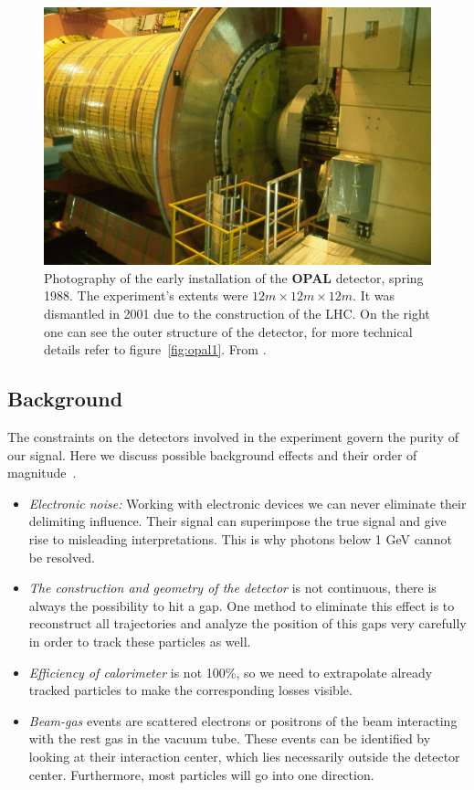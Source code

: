 \begin{figure}[htpb]
    \centering
    \includegraphics[width=1.0\linewidth]{figures/opal_photo}
    \caption{Photography of the early installation of the \textbf{OPAL} detector, spring 1988. 
        The experiment's extents were $12m \times 12m \times 12m$. 
        It was dismantled in 2001 due to the construction of the LHC. On the right one can see the outer structure of the detector, 
        for more technical details refer to figure~\ref{fig:opal1}. 
        From \cite{CERN_OPAL}.}
    \label{fig:opal_photo}
\end{figure}

\subsection{Background}
\label{sub:background}
The constraints on the detectors involved in the experiment govern the purity of our signal. Here we
discuss possible background effects and their order of magnitude~\cite{ver}.
\begin{itemize}
    \item \textit{Electronic noise:} Working with electronic devices we can never eliminate their delimiting influence. 
        Their signal
        can superimpose the true signal and give rise to misleading interpretations. This is why photons below 1 GeV cannot
        be resolved.
    \item \textit{The construction and geometry of the detector} is not continuous, there is always the possibility to hit a gap.
        One method to eliminate this effect is to reconstruct all trajectories and analyze the position of this gaps very
        carefully in order to track these particles as well.
    \item \textit{Efficiency of calorimeter} is not 100\%, so we need to extrapolate already tracked particles to make
    the corresponding losses visible.
\item \textit{Beam-gas} events are scattered electrons or positrons of the beam interacting with the rest gas in the vacuum
    tube. These events can be identified by looking at their interaction center,
    which lies necessarily outside the detector center. Furthermore, most particles will go into one direction.  
\end{itemize}



